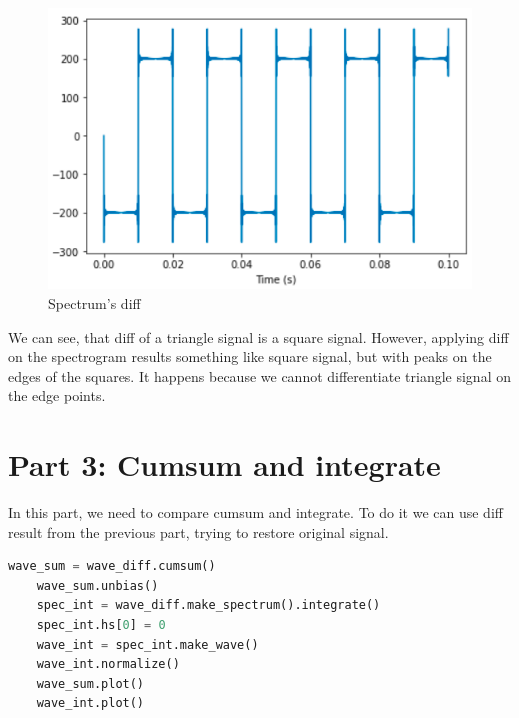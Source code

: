 \documentclass[a4paper]{article}
\begin{document}
        \begin{figure}[H]
            \centering
            \includegraphics[width=\textwidth]{img/p2_3.png}
            \caption{Spectrum's diff}
            \label{fig:part1_1_2}
        \end{figure}
        
        We can see, that diff of a triangle signal is a square signal. However, applying diff on the spectrogram results something like square signal, but with peaks on the edges of the squares. It happens because we cannot differentiate triangle signal on the edge points.
            
    \newpage
        \section{Part 3: Cumsum and integrate}
        
        In this part, we need to compare cumsum and integrate. To do it we can use diff result from the previous part, trying to restore original signal.
            
        \begin{lstlisting}[language=Python,caption=Integration code,label={lst:part1_2}]
    wave_sum = wave_diff.cumsum()
    wave_sum.unbias()
    spec_int = wave_diff.make_spectrum().integrate()
    spec_int.hs[0] = 0
    wave_int = spec_int.make_wave()
    wave_int.normalize()
    wave_sum.plot()
    wave_int.plot()
        \end{lstlisting}
        
\end{document}
